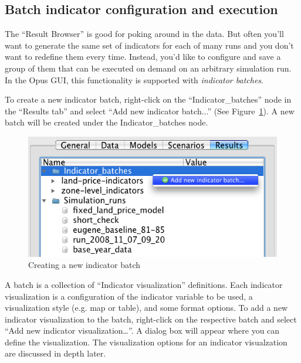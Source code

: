\subsection{Batch indicator configuration and execution}
\label{sec:batch-indicator-configuration}

The ``Result Browser'' is good for poking around in the
data. But often you'll want to generate the same
set of indicators for each of many runs and you don't want to
redefine them every time. Instead, you'd like to configure and save a
group of them that can be executed on demand on an arbitrary
simulation run. In the Opus GUI, this functionality is supported with
\emph{indicator batches}. 

To create a new indicator batch, right-click on the
 ``Indicator\_batches'' node in the ``Results tab'' and select
 ``Add new indicator batch...'' (See
Figure~\ref{fig:results-manager-new-batch}). A new batch will be
created under the Indicator\_batches node.

\begin{figure}[htp]
\begin{center}
\includegraphics[width=.6\textwidth]{part-gui/images/result-manager-add-new-batch.png}
\end{center}
\caption{Creating a new indicator batch}
\label{fig:results-manager-new-batch}
\end{figure}

A batch is a collection of ``Indicator visualization''
definitions. Each indicator visualization is a configuration of
the indicator variable to be used, a visualization style (e.g. map or
table), and some format options. To add a new indicator visualization
to the batch, right-click on the respective batch and select
``Add new indicator visualization\ldots''. A dialog box will
appear where you can define the visualization. The visualization
options for an indicator visualzation are discussed in depth later.

